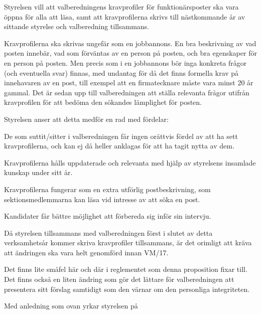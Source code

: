 \documentclass[../_main/handlingar.tex]{subfiles}
\begin{document}

Styrelsen vill att valberedningens kravprofiler för funktionärsposter ska vara öppna för alla att läsa, samt att kravprofilerna skrivs till nästkommande år av sittande styrelse och valberedning tillsammans.

Kravprofilerna ska skrivas ungefär som en jobbannons. En bra beskrivning av vad posten innebär, vad som förväntas av en person på posten, och bra egenskaper för en person på posten. Men precis som i en jobbannons bör inga konkreta frågor (och eventuella svar) finnas, med undantag för då det finns formella krav på innehavaren av en post, till exempel att en firmatecknare måste vara minst 20 år gammal. Det är sedan upp till valberedningen att ställa relevanta frågor utifrån kravprofilen för att bedöma den sökandes lämplighet för posten.

Styrelsen anser att detta medför en rad med fördelar:
\begin{dashlist}
    \item De som suttit/sitter i valberedningen får ingen orättvis fördel av att ha sett kravprofilerna, och kan ej då heller anklagas för att ha tagit nytta av dem.
    \item Kravprofilerna hålls uppdaterade och relevanta med hjälp av styrelsens insamlade kunskap under sitt år.
    \item Kravprofilerna fungerar som en extra utförlig postbeskrivning, som sektionsmedlemmarna kan läsa vid intresse av att söka en post.
    \item Kandidater får bättre möjlighet att förbereda sig inför sin intervju.
\end{dashlist}

Då styrelsen tillsammans med valberedningen först i slutet av detta verksamhetsår kommer skriva kravprofiler tillsammans, är det orimligt att kräva att ändringen ska vara helt genomförd innan VM/17.

Det finns lite småfel här och där i reglementet som denna proposition fixar till. Det finns också en liten ändring som gör det lättare för valberedningen att presentera sitt förslag samtidigt som den värnar om den personliga integriteten.

\newpage

Med anledning som ovan yrkar styrelsen på
\end{document}
